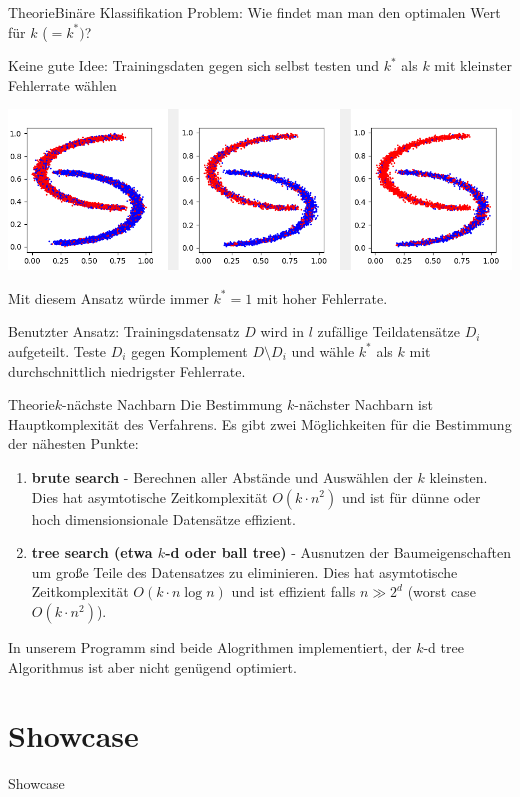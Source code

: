 \documentclass[9pt]{beamer}
\begin{document}
\begin{frame}{Theorie}{Binäre Klassifikation}
Problem: Wie findet man man den optimalen Wert für $k$ ($=k^*)$?

Keine gute Idee: Trainingsdaten gegen sich selbst testen und $k^*$ als $k$ mit kleinster Fehlerrate wählen
\begin{center}\includegraphics[scale=0.40]{assets/naive_approach.png}\end{center}
Mit diesem Ansatz würde immer $k^*=1$ mit hoher Fehlerrate.

Benutzter Ansatz: Trainingsdatensatz $D$ wird in $l$ zufällige Teildatensätze $D_i$ aufgeteilt. Teste $D_i$ gegen Komplement $D \setminus D_i$ und wähle $k^*$ als $k$ mit durchschnittlich niedrigster Fehlerrate.
\end{frame}

\begin{frame}{Theorie}{$k$-nächste Nachbarn}
Die Bestimmung $k$-nächster Nachbarn ist Hauptkomplexität des Verfahrens. Es gibt zwei Möglichkeiten für die Bestimmung der nähesten Punkte:
\begin{enumerate}
\item \textbf{brute search} - Berechnen aller Abstände und Auswählen der $k$ kleinsten. Dies hat asymtotische Zeitkomplexität $O(k\cdot n^2)$ und ist für dünne oder hoch dimensionsionale Datensätze effizient.
\item \textbf{tree search (etwa $k$-d oder ball tree)} - Ausnutzen der Baumeigenschaften um große Teile des Datensatzes zu eliminieren. Dies hat asymtotische Zeitkomplexität $O(k \cdot n \log n)$ und ist effizient falls $n \gg 2^d$ (worst case $O(k\cdot n^2)$).
\end{enumerate}
In unserem Programm sind beide Alogrithmen implementiert, der $k$-d tree Algorithmus ist aber nicht genügend optimiert.
\end{frame}

\section{Showcase}
\begin{frame}{Showcase}{}

\end{frame}
\end{document}
